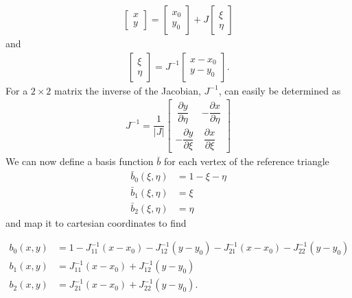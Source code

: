 \documentclass[11pt,letterpaper,titlepage]{article}
\numberwithin{equation}{section}
\begin{document}
\begin{align}
\begin{bmatrix}
x \\ 
y
\end{bmatrix}
=
\begin{bmatrix}
x_0 \\ 
y_0
\end{bmatrix} 
+ J
\begin{bmatrix}
\xi \\ 
\eta
\end{bmatrix}
\end{align}
and
\begin{align}\label{eq:2dmap_nat_to_cart}
\begin{bmatrix}
\xi \\ 
\eta
\end{bmatrix}
=J^{-1}
\begin{bmatrix}
x -x_0\\ 
y -y_0
\end{bmatrix}.
\end{align}
For a $2{\times}2$ matrix the inverse of the Jacobian, $J^{-1}$, can easily be determined as
\begin{align}
J^{-1}=\dfrac{1}{|J|}
\begin{bmatrix}
\ \dfrac{\partial y}{\partial \eta} &-\dfrac{\partial x}{\partial \eta} \\
-\dfrac{\partial y}{\partial \xi} & \ \dfrac{\partial x}{\partial \xi}
\end{bmatrix}
\end{align}
We can now define a basis function $\bar{b}$ for each vertex of the reference triangle 
\begin{equation}
\begin{aligned}
\bar{b}_0(\xi,\eta) &= 1-\xi -\eta \\
\bar{b}_1(\xi,\eta) &= \xi\\
\bar{b}_2(\xi,\eta) &= \eta 
\end{aligned}
\end{equation}
and map it to cartesian coordinates to find

\begin{equation}
\begin{aligned}
b_0(x,y) &= 1 - J_{11}^{-1}(x - x_0) - J_{12}^{-1}(y-y_0)- J_{21}^{-1}(x - x_0) - J_{22}^{-1}(y-y_0) \\
b_1(x,y) &=J_{11}^{-1}(x - x_0) + J_{12}^{-1}(y-y_0) \\
b_2(x,y) &=J_{21}^{-1}(x - x_0) + J_{22}^{-1}(y-y_0).
\end{aligned}
\end{equation}
\newline
\end{document}
